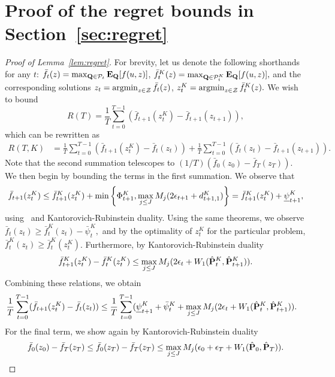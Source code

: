 \section{Proof of the regret bounds in Section~\ref{sec:regret}}
\label{app:regret}
\begin{proof}[Proof of Lemma~\ref{lem:regret}]
For brevity, let us denote the following shorthands for any $t$:
 $\bar{f}_t(z) = \max_{\mathbf{Q} \in \mathcal{P}_t} \mathbf{E}_{\mathbf{Q}}[f(u,z)]$, $\bar{f}^K_t(z) = \max_{\mathbf{Q} \in \mathcal{P}^K_{t}} \mathbf{E}_{\mathbf{Q}}[f(u,z)],$ 
 and the corresponding solutions 
 $z_t = \mathop{\rm argmin}_{z \in \mathcal{Z}}\bar{f}_t(z)$, $z^K_{t} = \mathop{\rm argmin}_{z \in \mathcal{Z}}\bar{f}^K_{t}(z).$
We wish to bound 
$$R(T) = \frac{1}{T}\sum_{t=0}^{T-1} \left(\bar{f}_{t+1}(z^K_{t}) - \bar{f}_{t+1}(z_{t+1})\right),$$
which can be rewritten as
\begin{equation*}
\begin{aligned}
  R(T,K) &=\frac{1}{T}\sum_{t=0}^{T-1} \left(\bar{f}_{t+1}(z^K_{t}) - \bar{f}_{t}(z_{t})\right) + \frac{1}{T}\sum_{t=0}^{T-1} \left( \bar{f}_{t}(z_{t}) - \bar{f}_{t+1}(z_{t+1})\right).
\end{aligned}
\end{equation*}
Note that the second summation telescopes to $(1/T)\left( \bar{f}_{0}(z_{0}) - \bar{f}_{T}(z_{T})\right).$
We then begin by bounding the terms in the first summation. We observe that
$$\bar{f}_{t+1}(z^K_{t}) \leq \bar{f}^K_{t+1}(z^K_{t}) + \min\left\{ \Phi^K_{t+1},  \max_{j\leq J}M_j(2\epsilon_{t+1}+d^K_{{t+1},1})\right\} = \bar{f}^K_{t+1}(z^K_{t}) + \underline{\psi}_{t+1}^K,$$
using~\cite[Theorem 5]{mro} and Kantorovich-Rubinstein duality. Using the same theorems, we observe
$\bar{f}_{t}(z_{t}) \geq \bar{f}_{t}^K(z_{t}) - \bar{\psi}_t^K,$
and by the optimality of $z^K_{t}$ for the particular problem, $\bar{f}_{t}^K(z_{t}) \geq \bar{f}_{t}^K(z^K_{t})$.
Furthermore, by Kantorovich-Rubinstein duality
$$ \bar{f}^K_{t+1}(z^K_{t}) -\bar{f}_{t}^K(z^K_{t}) \leq \max_{j\leq J}M_j(2\epsilon_{t} + W_1(\hat{{\mathbf P}}^K_t,\hat{{\mathbf P}}^K_{t+1})).$$
Combining these relations, we obtain
    \begin{equation}
    \begin{aligned}
    \label{lem:regret_eq}
    \frac{1}{T}& \sum_{t=0}^{T-1} (\bar{f}_{t+1}(z^K_{t}) - \bar{f}_{t}(z_{t})) \leq \frac{1}{T}\sum_{t=0}^{T-1}  (\underline{\psi}_{t+1}^K + \bar{\psi}_t^K  + \max_{j\leq J}M_j(2\epsilon_{t} +W_1(\hat{{\mathbf P}}^K_t,\hat{{\mathbf P}}^K_{t+1})).
    \end{aligned}
    \end{equation} 
For the final term, we show again by Kantorovich-Rubinstein duality
$$\bar{f}_{0}(z_{0}) - \bar{f}_{T}(z_{T}) \leq \bar{f}_{0}(z_{T}) - \bar{f}_{T}(z_{T})\leq  \max_{j\leq J}M_j(\epsilon_0 + \epsilon_{T} +W_1(\hat{{\mathbf P}}_0,\hat{{\mathbf P}}_{T})).$$
\end{proof}

